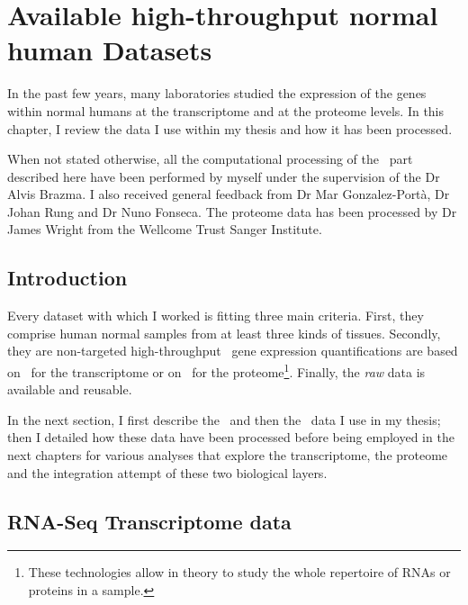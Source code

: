 \chapter{Available high-throughput normal human Datasets}
\label{ch:datasets}

\begin{comment}
\setlength{\epigraphwidth}{0.57\textwidth}
\setlength{\epigraphrule}{0.1pt}
\epigraph{Data! Data! Data! I can’t make bricks without clay!}{Sherlock Homes
    (Sir Arthur Conan Doyle)}
\end{comment}

In the past few years, many laboratories studied the expression
of the genes within normal humans at the transcriptome and at
the proteome levels. In this chapter, I review the data I use within my thesis
and how it has been processed.

When not stated otherwise, all the computational processing of the \Rnaseq\ part
described here have been performed by myself under the supervision of
the Dr Alvis Brazma. I also received general feedback from Dr Mar Gonzalez-Portà,
Dr Johan Rung and Dr Nuno Fonseca. The proteome data has been processed by
Dr James Wright from the Wellcome Trust Sanger Institute.


\section{Introduction}

Every dataset with which I worked is fitting three main criteria.
First, they comprise human normal samples from at least three kinds of tissues.
Secondly, they are non-targeted high-throughput \ie\ gene expression
quantifications are based on \Rnaseq\ for the transcriptome or on \ms\ for the
proteome\footnote{These technologies allow in theory to study the whole
repertoire of \glspl{RNA} or proteins in a sample.}.
Finally, the \emph{raw} data is available and reusable.

In the next section, I first describe the \Rnaseq\ and then the \ms\ data I use
in my thesis; then I detailed how these data have been processed before being
employed in the next chapters for various analyses that explore the transcriptome,
the proteome and the integration attempt of these two biological layers.


\section{RNA-Seq Transcriptome data}

